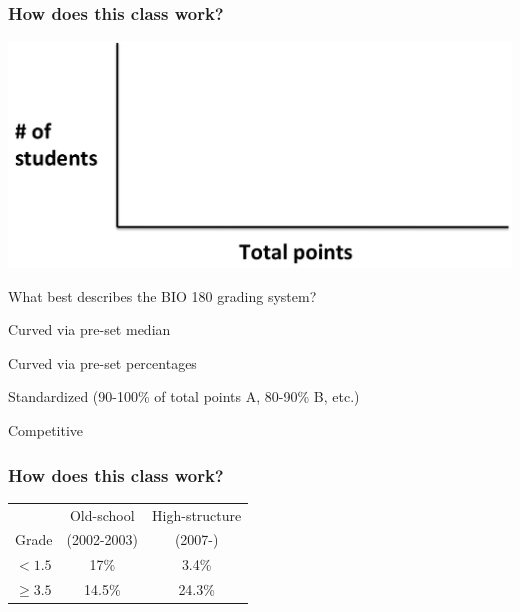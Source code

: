 \begin{noheadline}
\begin{frame}
    \frametitle{How does this class work?}

    \begin{center}%
        \includegraphics[width=1\textwidth]{grading-plot.png}
    \end{center}
    
    \begin{clickerquestion}
        \item What best describes the BIO 180 grading system?
            \begin{clickeroptions}
            \item Curved via pre-set median
            \item Curved via pre-set percentages
            \item Standardized (90-100\% of total points A, 80-90\% B, etc.)
            \item Competitive
            \item {}
        \end{clickeroptions}
    \end{clickerquestion}
\end{frame}
\end{noheadline}

\begin{noheadline}
\begin{frame}
    \frametitle{How does this class work?}

    \begin{table}%
        \centering
        \begin{tabular}{ l | c c }
            & Old-school & High-structure \\
            Grade & (2002-2003) & (2007-) \\
            \hline
            $< 1.5$ & 17\% & 3.4\% \\
            $\geq 3.5$ & 14.5\% & 24.3\% \\
        \end{tabular}
    \end{table}

\end{frame}
\end{noheadline}

